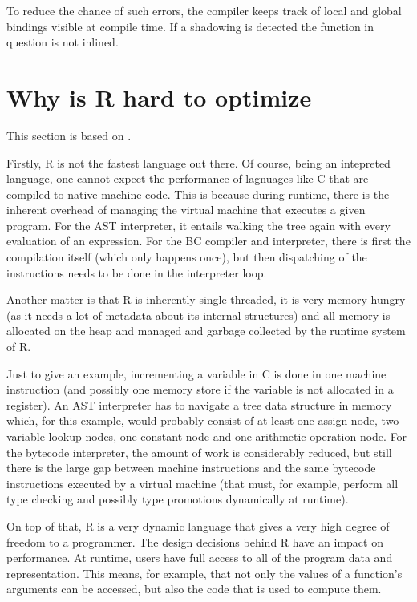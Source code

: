 {To reduce the chance of such errors, the compiler keeps track of local and global bindings visible at compile time. If a shadowing is detected the function in question is not inlined.


\section{Why is R hard to optimize}

This section is based on  \autocite{design, hadley}.

Firstly, R is not the fastest language out there. Of course, being an intepreted language, one cannot expect the performance of lagnuages like C that are compiled to native machine code. This is because during runtime, there is the inherent overhead of managing the virtual machine that executes a given program. For the AST interpreter, it entails walking the tree again with every evaluation of an expression. For the BC compiler and interpreter, there is first the compilation itself (which only happens once), but then dispatching of the instructions needs to be done in the interpreter loop.

Another matter is that R is inherently single threaded, it is very memory hungry (as it needs a lot of metadata about its internal structures) and all memory is allocated on the heap and managed and garbage collected by the runtime system of R.

Just to give an example, incrementing a variable in C is done in one machine instruction (and possibly one memory store if the variable is not allocated in a register). An AST interpreter has to navigate a tree data structure in memory which, for this example, would probably consist of at least one assign node, two variable lookup nodes, one constant node and one arithmetic operation node. For the bytecode interpreter, the amount of work is considerably reduced, but still there is the large gap between machine instructions and the same bytecode instructions executed by a virtual machine (that must, for example, perform all type checking and possibly type promotions dynamically at runtime).

On top of that, R is a very dynamic language that gives a very high degree of freedom to a programmer. The design decisions behind R have an impact on performance. At runtime, users have full access to all of the program data and representation. This means, for example, that not only the values of a function's arguments can be accessed, but also the code that is used to compute them.

}
